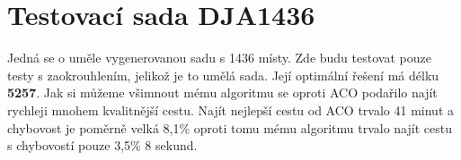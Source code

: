 \begin{table}[H]
\centering
\caption{PKB411 -- MyAlgo s s zaokrouhlením}
\end{table}


\section{Testovací sada DJA1436}
Jedná se o uměle vygenerovanou sadu s 1436 místy. Zde budu testovat pouze testy s zaokrouhlením, jelikož je to umělá sada. Její optimální řešení má délku \textbf{5257}. Jak si můžeme všimnout mému algoritmu se oproti ACO podařilo najít rychleji mnohem kvalitnější cestu. Najít nejlepší cestu od ACO trvalo 41 minut a chybovost je poměrně velká 8,1\% oproti tomu mému algoritmu trvalo najít cestu s chybovostí pouze 3,5\% 8 sekund. 
\begin{table}[H]
\caption{DJA1436 -- ACO}
\centering
{}
\end{table}

